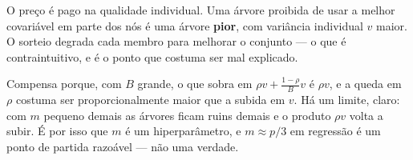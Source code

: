 \begin{solucao}
O preço é pago na qualidade individual. Uma árvore proibida de usar a melhor
covariável em parte dos nós é uma árvore \textbf{pior}, com variância individual
$v$ maior. O sorteio degrada cada membro para melhorar o conjunto --- o que é
contraintuitivo, e é o ponto que costuma ser mal explicado.

Compensa porque, com $B$ grande, o que sobra em $\rho v+\frac{1-\rho}{B}v$ é
$\rho v$, e a queda em $\rho$ costuma ser proporcionalmente maior que a subida em
$v$. Há um limite, claro: com $m$ pequeno demais as árvores ficam ruins demais e o
produto $\rho v$ volta a subir. É por isso que $m$ é um hiperparâmetro, e
$m\approx p/3$ em regressão é um ponto de partida razoável --- não uma verdade.
\end{solucao}
